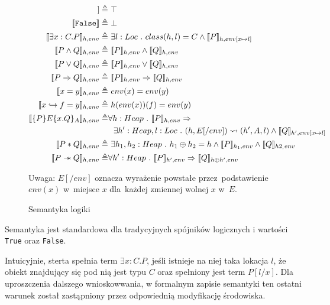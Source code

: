 \documentclass[]{pracamgr}
\newcommand \wand {\mathrel{-\mkern-6mu*}}
\newcommand \hoare [5] {\{#1\}#2\{#4.#5\}_#3}
\renewcommand \| {\hspace{0.75em} | \hspace{0.75em} }
\renewcommand \[ {[\![}
\renewcommand \] {]\!]}
\theoremstyle{definition}
\begin{document}
\begin{figure}[H]
\begin{align*}
 \[ \texttt{True} \] \triangleq & \ \top \\
 \[ \texttt{False} \] \triangleq & \ \bot \\
 \[ \exists x : C . P \]_{h, env} \triangleq & \ \exists l : Loc\ .\ class(h, l) = C \wedge
    \[ P \]_{h, env[x \mapsto l]}  \\
 \[ P \wedge Q \]_{h, env} \triangleq & \ \[ P \]_{h, env} \wedge \[ Q \]_{h, env} \\
 \[ P \vee Q \]_{h, env} \triangleq & \ \[ P \]_{h, env} \vee \[ Q \]_{h, env} \\
 \[ P \Rightarrow Q \]_{h, env} \triangleq & \ \[ P \]_{h, env} \Rightarrow \[ Q \]_{h, env} \\
 \[ x = y \]_{h, env} \triangleq & \ env(x) = env(y) \\
 \[ x \hookrightarrow f = y \]_{h, env} \triangleq & \ h(env(x))(f) = env(y) \\
 \[ \hoare{P}{E}{A}{x}{Q} \]_{h, env} \triangleq & \forall h : Heap \ . \ \[ P \]_{h, env} \Rightarrow \\
      & \ \  \exists h' : Heap, l : Loc \ . \ (h, E[/env]) \leadsto (h', A, l) \wedge
      \[ Q \]_{h', env[x \mapsto l]}  \\
 \[ P * Q \]_{h, env} \triangleq & \ \exists h_1,h_2 : Heap\ .\ h_1 \oplus h_2 = h \wedge
    \[ P \]_{h_1, env} \wedge \[ Q \]_{h2_, env}  \\
 \[ P \wand Q \]_{h, env} \triangleq & \forall h' : Heap \ . \ \[ P \]_{h', env} \Rightarrow \[ Q \]_{h \oplus h', env}
\end{align*}

Uwaga: $E[/env]$ oznacza wyrażenie powstałe przez~podstawienie $env(x)$ w~miejsce $x$ dla~każdej zmiennej
wolnej $x$ w~$E$.

\caption{Semantyka logiki}
\label{fig:sematics}
\end{figure}

\vspace{2em}

Semantyka jest standardowa dla tradycyjnych spójników logicznych i wartości \texttt{True}
oraz \texttt{False}.

Intuicyjnie, sterta spełnia term $\exists x : C . P$, jeśli istnieje na niej taka lokacja $l$,
że obiekt znajdujący się pod nią jest typu $C$ oraz spełniony jest term $P[l/x]$.
Dla uproszczenia dalszego wnioskowwania, w formalnym zapisie semantyki ten ostatni warunek został
zastąpniony przez odpowiednią modyfikację środowiska.
\end{document}
